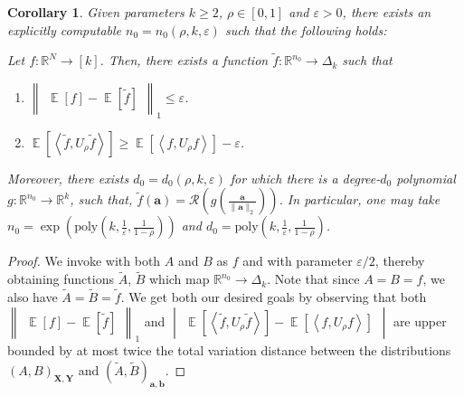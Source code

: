 \documentclass[11pt]{article}
\newcommand{\inparen}[1]{\left ( #1 \right )}
\newcommand{\insquare}[1]{\left [ #1 \right ]}
\newcommand{\inangle}[1]{\left \langle #1 \right \rangle}
\newcommand{\inabs}[1]{\begin{vmatrix} #1 \end{vmatrix}}
\newcommand{\norm}[2]{\begin{Vmatrix} #2 \end{Vmatrix}_{#1}}
\DeclareMathOperator*{\Ex}{\mathbb{E}}
\newcommand{\wtilde}[1]{\widetilde{#1}}
\newcommand{\eps}{\varepsilon}
\newcommand{\bbR}{{\mathbb R}}
\newcommand{\ba}{{\bm a}}
\newcommand{\bb}{{\bm b}}
\newcommand{\bX}{\mathbf{X}}
\newcommand{\bY}{\mathbf{Y}}
\newcommand{\calR}{\mathcal{R}}
\newcommand{\poly}{\mathrm{poly}}
\newtheorem{cor}[theorem]{Corollary}
\begin{document}
\begin{cor}\label{cor:noise-stability}
	Given parameters $k \ge 2$, $\rho \in [0,1]$ and $\eps > 0$, there exists an explicitly computable $n_0 = n_0(\rho, k, \eps)$ such that the following holds:
	
	Let $f : \bbR^N \to [k]$. Then, there exists a function $\wtilde{f} : \bbR^{n_0} \to \Delta_k$ such that
	\begin{enumerate}
		\item $\norm{1}{\Ex[f] - \Ex[\wtilde{f}]} \le \eps$.
		\item $\Ex\insquare{\inangle{\wtilde{f}, U_\rho \wtilde{f}}} \ge \Ex[\inangle{f, U_\rho f}] - \eps$.
	\end{enumerate}
	Moreover, there exists $d_0 = d_0(\rho, k, \eps)$ for which there is a degree-$d_0$ polynomial $g : \bbR^{n_0} \to \bbR^k $, such that, $\wtilde{f}(\ba) = \calR\inparen{g\inparen{\frac{\ba}{\|\ba\|_2}}}$. In particular, one may take $n_0 = \exp \inparen{\poly\inparen{k, \frac{1}{\eps}, \frac{1}{1-\rho}}}$ and $d_0 = \poly\inparen{k, \frac{1}{\eps}, \frac{1}{1-\rho}}$.%
\end{cor}
\begin{proof}
	We invoke  with both $A$ and $B$ as $f$ and with parameter $\eps/2$, thereby obtaining functions $\wtilde{A}$, $\wtilde{B}$ which map $\bbR^{n_0} \to \Delta_k$. Note that since $A = B = f$, we also have $\wtilde{A} = \wtilde{B} = \wtilde{f}$. We get both our desired goals by observing that both $\norm{1}{\Ex[f] - \Ex[\wtilde{f}]}$ and $\inabs{\Ex\insquare{\inangle{\wtilde{f}, U_\rho \wtilde{f}}} - \Ex[\inangle{f, U_\rho f}]}$ are upper bounded by at most twice the total variation distance between the distributions $(A,B)_{\bX,\bY}$ and $(\wtilde{A}, \wtilde{B})_{\ba, \bb}$.
\end{proof}

\end{document}
